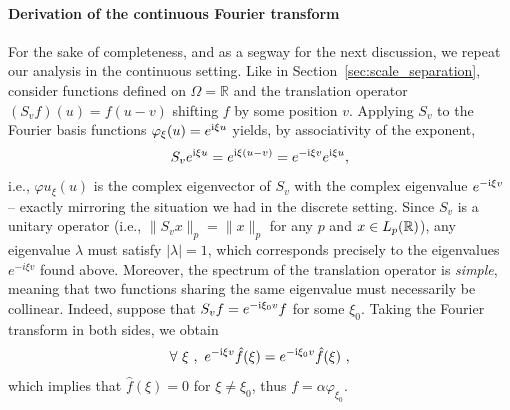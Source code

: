 \paragraph{Derivation of the continuous Fourier transform}
For the sake of completeness, and as a segway for the next discussion, we repeat our analysis in the continuous setting. 
Like in Section~\ref{sec:scale_separation}, consider functions defined on $\Omega = \mathbb{R}$ and the translation operator $(S_v f)(u) = f(u-v)$ shifting $f$ by some position $v$. 
 Applying $S_v$ to the Fourier basis functions $\varphi_\xi(u) = e^{\mathrm{i} \xi u}$  yields, by associativity of the exponent,  
$$
S_v e^{\mathrm{i}\xi u} = e^{\mathrm{i}\xi (u-v)} = e^{-\mathrm{i}\xi v} e^{\mathrm{i}\xi u},
$$
i.e., $\varphi{u}_\xi(u)$ is the complex eigenvector of $S_v$ with the complex eigenvalue  $e^{-\mathrm{i}\xi v} $ -- exactly mirroring the situation we had in the discrete setting. 
Since $S_v$ is a unitary operator (i.e., $\| S_v x \|_p = \| x \|_p$ for any $p$ and $x \in L_p(\mathbb{R})$), any eigenvalue $\lambda$ must satisfy $|\lambda|=1$, which corresponds precisely to the eigenvalues $e^{-i\xi v}$ found above. 
Moreover, the spectrum of the translation operator is \emph{simple}, meaning that two functions sharing the same eigenvalue must necessarily be collinear. Indeed, suppose that $S_v f = e^{-\mathrm{i} \xi_0 v} f$ for some $\xi_0$. Taking the Fourier transform in both sides, we obtain 
$$\forall ~\xi~,~e^{-\mathrm{i} \xi v} \hat{f}(\xi) = e^{-\mathrm{i} \xi_0 v} \hat{f}(\xi)~,$$
which implies that $\hat{f}(\xi)=0$ for $\xi \neq \xi_0$, thus $f = \alpha \varphi_{\xi_0}$.


